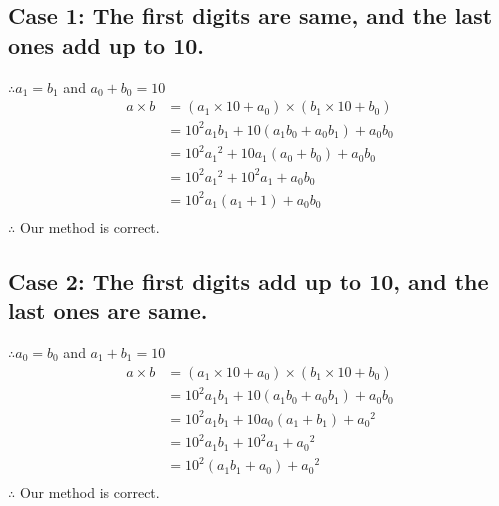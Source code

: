 \documentclass[12pt]{article}
\begin{document}
\subsection{Case 1: The first digits are same, and the last ones add up to 10.}
$\therefore a_1 = b_1$ and $a_0 + b_0 = 10$
\begin{align*}
a \times b &= (a_1 \times 10 + a_0) \times (b_1 \times 10 + b_0)\\
&= 10^2a_1b_1 + 10(a_1b_0 + a_0b_1) + a_0b_0\\
&= 10^2{a_1}^2 + 10a_1(a_0 + b_0) + a_0b_0\\
&= 10^2{a_1}^2 + 10^2a_1 + a_0b_0\\
&= 10^2a_1(a_1 + 1) + a_0b_0\\
\end{align*}
$\therefore$ Our method is correct.

\subsection{Case 2: The first digits add up to 10, and the last ones are same.}
$\therefore a_0 = b_0$ and $a_1 + b_1 = 10$
\begin{align*}
a \times b &= (a_1 \times 10 + a_0) \times (b_1 \times 10 + b_0)\\
&= 10^2a_1b_1 + 10(a_1b_0 + a_0b_1) + a_0b_0\\
&= 10^2a_1b_1 + 10a_0(a_1 + b_1) + {a_0}^2\\
&= 10^2a_1b_1 + 10^2a_1 + {a_0}^2\\
&= 10^2(a_1b_1 + a_0) + {a_0}^2\\
\end{align*}
$\therefore$ Our method is correct.~\cite{wikib}

{}

\end{document}
